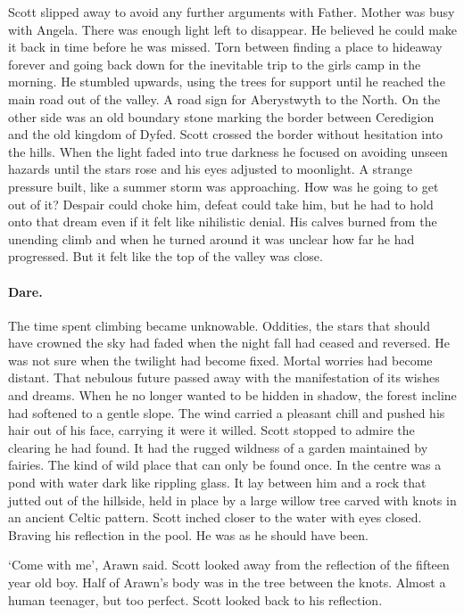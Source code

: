 Scott slipped away to avoid any further arguments with Father. Mother
was busy with Angela. There was enough light left to disappear. He
believed he could make it back in time before he was missed. Torn
between finding a place to hideaway forever and going back down for
the inevitable trip to the girls camp in the morning. He stumbled
upwards, using the trees for support until he reached the main road
out of the valley. A road sign for Aberystwyth to the North. On the
other side was an old boundary stone marking the border between
Ceredigion and the old kingdom of Dyfed. Scott crossed the border
without hesitation into the hills. When the light faded into true
darkness he focused on avoiding unseen hazards until the stars rose
and his eyes adjusted to moonlight. A strange pressure built, like a
summer storm was approaching. How was he going to get out of it?
Despair could choke him, defeat could take him, but he had to hold
onto that dream even if it felt like nihilistic denial. His calves
burned from the unending climb and when he turned around it was
unclear how far he had progressed. But it felt like the top of the
valley was close.

\paragraph{Dare.}

The time spent climbing became unknowable. Oddities, the stars that
should have crowned the sky had faded when the night fall had ceased
and reversed. He was not sure when the twilight had become
fixed. Mortal worries had become distant. That nebulous future passed
away with the manifestation of its wishes and dreams. When he no
longer wanted to be hidden in shadow, the forest incline had softened
to a gentle slope. The wind carried a pleasant chill and pushed his
hair out of his face, carrying it were it willed. Scott stopped to
admire the clearing he had found. It had the rugged wildness of a
garden maintained by fairies. The kind of wild place that can only be
found once. In the centre was a pond with water dark like rippling
glass. It lay between him and a rock that jutted out of the hillside,
held in place by a large willow tree carved with knots in an ancient
Celtic pattern. Scott inched closer to the water with eyes
closed. Braving his reflection in the pool. He was as he should have
been.

`Come with me', Arawn said. Scott looked away from the reflection of
the fifteen year old boy. Half of Arawn's body was in the tree between
the knots. Almost a human teenager, but too perfect. Scott looked back
to his reflection.

